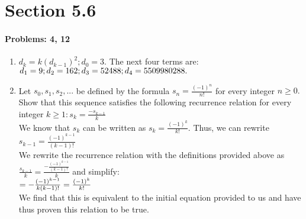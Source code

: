 \documentclass{article}
\makeatletter
\newcommand\setItemnumber[1]{\setcounter{enum\romannumeral\@enumdepth}{\numexpr#1-1\relax}}
\makeatother
\begin{document}
\section{Section 5.6}
\paragraph{Problems: 4, 12}
\begin{enumerate}
\setItemnumber{4}
    \item $d_k=k(d_{k-1})^2;d_0=3$. The next four terms are: $d_1=9;d_2=162;\\d_3=52488;d_4=5509980288.$
    \setItemnumber{12}
    \item Let $s_0,s_1,s_2,...$ be defined by the formula $s_n=\frac{(-1)^n}{n!}$ for every integer $n\geq0.$  Show that this sequence satisfies the following recurrence relation for every integer $k\geq1:   s_k=\frac{-s_{k-1}}{k}$\\
    We know that $s_k$ can be written as $s_k=\frac{(-1)^k}{k!}$. Thus, we can rewrite $s_{k-1} = \frac{(-1)^{k-1}}{(k-1)!}$\\
    We rewrite the recurrence relation with the definitions provided above as $\frac{s_{k-1}}{k} = \frac{-\frac{(-1)^{k-1}}{(k-1)!}}{k}$ and simplify:\\
    $=-\frac{(-1)^{k-1}}{k(k-1)!}\\=\frac{(-1)^k}{k!}$ \\
    We find that this is equivalent to the initial equation provided to us and have thus proven this relation to be true.
\end{enumerate}
\end{document}
